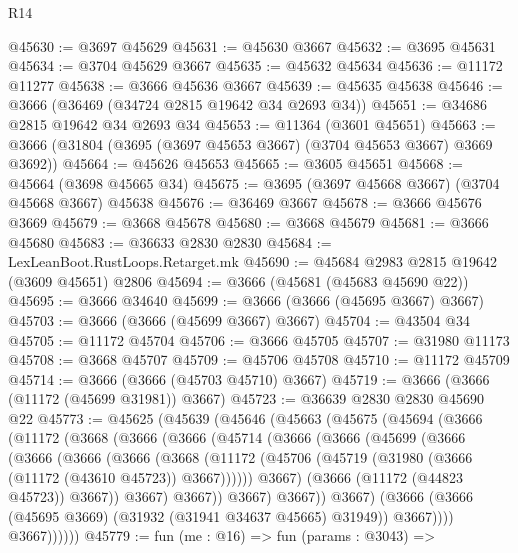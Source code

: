 \begin{lexlean}{R14}
\begin{coremodule}
@45630 := @3697 @45629
@45631 := @45630 @3667
@45632 := @3695 @45631
@45634 := @3704 @45629 @3667
@45635 := @45632 @45634
@45636 := @11172 @11277
@45638 := @3666 @45636 @3667
@45639 := @45635 @45638
@45646 := @3666 (@36469 (@34724 @2815 @19642 @34 @2693 @34))
@45651 := @34686 @2815 @19642 @34 @2693 @34
@45653 := @11364 (@3601 @45651)
@45663 := @3666 (@31804 (@3695 (@3697 @45653 @3667) (@3704 @45653 @3667) @3669 @3692))
@45664 := @45626 @45653
@45665 := @3605 @45651
@45668 := @45664 (@3698 @45665 @34)
@45675 := @3695 (@3697 @45668 @3667) (@3704 @45668 @3667) @45638
@45676 := @36469 @3667
@45678 := @3666 @45676 @3669
@45679 := @3668 @45678
@45680 := @3668 @45679
@45681 := @3666 @45680
@45683 := @36633 @2830 @2830
@45684 := LexLeanBoot.RustLoops.Retarget.mk
@45690 := @45684 @2983 @2815 @19642 (@3609 @45651) @2806
@45694 := @3666 (@45681 (@45683 @45690 @22))
@45695 := @3666 @34640
@45699 := @3666 (@3666 (@45695 @3667) @3667)
@45703 := @3666 (@3666 (@45699 @3667) @3667)
@45704 := @43504 @34
@45705 := @11172 @45704
@45706 := @3666 @45705
@45707 := @31980 @11173
@45708 := @3668 @45707
@45709 := @45706 @45708
@45710 := @11172 @45709
@45714 := @3666 (@3666 (@45703 @45710) @3667)
@45719 := @3666 (@3666 (@11172 (@45699 @31981)) @3667)
@45723 := @36639 @2830 @2830 @45690 @22
@45773 := @45625
    (@45639
      (@45646
        (@45663
          (@45675
            (@45694
              (@3666
                (@11172
                  (@3668
                    (@3666
                      (@3666
                        (@45714
                          (@3666
                            (@3666
                              (@45699
                                (@3666
                                  (@3666
                                    (@3666
                                      (@3666
                                        (@3668
                                          (@11172
                                            (@45706
                                              (@45719
                                                (@31980 (@3666 (@11172 (@43610 @45723)) @3667))))))
                                        @3667)
                                      (@3666 (@11172 (@44823 @45723)) @3667))
                                    @3667)
                                  @3667))
                              @3667)
                            @3667))
                        @3667)
                      (@3666 (@3666 (@45695 @3669) (@31932 (@31941 @34637 @45665) @31949)) @3667))))
                @3667))))))
@45779 := fun (me : @16) =>
  fun (params : @3043) =>

\end{coremodule}
\end{lexlean}
